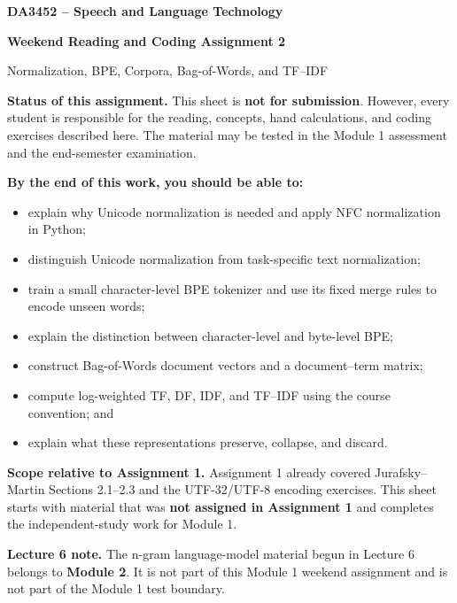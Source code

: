 \documentclass[11pt,a4paper]{article}
\begin{document}
\begin{center}
  {\sffamily\bfseries\color{slate}\LARGE DA3452 -- Speech and Language Technology}\par
  \vspace{0.35em}
  {\sffamily\bfseries\color{teal}\Large Weekend Reading and Coding Assignment 2}\par
  \vspace{0.2em}
  {\sffamily\large Normalization, BPE, Corpora, Bag-of-Words, and TF--IDF}
\end{center}

\begin{noticebox}
\textbf{Status of this assignment.} This sheet is \textbf{not for submission}. However, every student is responsible for the reading, concepts, hand calculations, and coding exercises described here. The material may be tested in the Module 1 assessment and the end-semester examination.
\end{noticebox}

\begin{objectivebox}
\textbf{By the end of this work, you should be able to:}
\begin{itemize}
  \item explain why Unicode normalization is needed and apply NFC normalization in Python;
  \item distinguish Unicode normalization from task-specific text normalization;
  \item train a small character-level BPE tokenizer and use its fixed merge rules to encode unseen words;
  \item explain the distinction between character-level and byte-level BPE;
  \item construct Bag-of-Words document vectors and a document--term matrix;
  \item compute log-weighted TF, DF, IDF, and TF--IDF using the course convention; and
  \item explain what these representations preserve, collapse, and discard.
\end{itemize}
\end{objectivebox}

\begin{checkbox}
\textbf{Scope relative to Assignment 1.} Assignment 1 already covered Jurafsky--Martin Sections 2.1--2.3 and the UTF-32/UTF-8 encoding exercises. This sheet starts with material that was \textbf{not assigned in Assignment 1} and completes the independent-study work for Module 1.

\medskip
\textbf{Lecture 6 note.} The n-gram language-model material begun in Lecture 6 belongs to \textbf{Module 2}. It is not part of this Module 1 weekend assignment and is not part of the Module 1 test boundary.
\end{checkbox}
\end{document}
